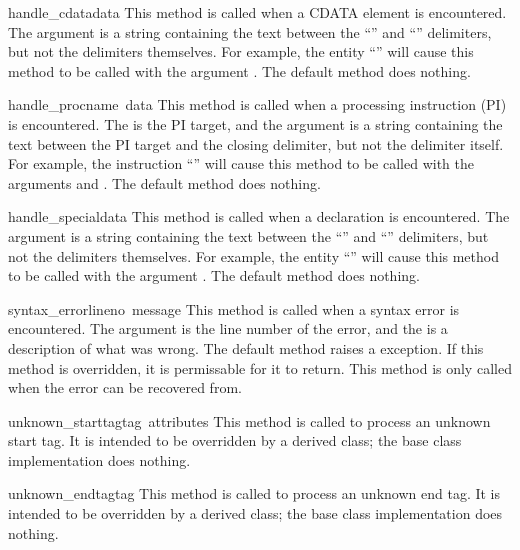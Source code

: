\begin{funcdesc}{handle_cdata}{data}
This method is called when a CDATA element is encountered.  The
 argument is a string containing the text between the
``\code{<![CDATA[}'' and ``\code{]]>}'' delimiters, but not the delimiters
themselves.  For example, the entity ``\code{<![CDATA[text]]>}'' will
cause this method to be called with the argument .  The
default method does nothing.
\end{funcdesc}

\begin{funcdesc}{handle_proc}{name\, data}
This method is called when a processing instruction (PI) is encountered.  The
 is the PI target, and the  argument is a
string containing the text between the PI target and the closing delimiter,
but not the delimiter itself.  For example, the instruction
``'' will cause this method to be called with the
arguments  and .  The default method does
nothing.
\end{funcdesc}

\begin{funcdesc}{handle_special}{data}
This method is called when a declaration is encountered.  The
 argument is a string containing the text between the
``\code{<!}'' and ``\code{>}'' delimiters, but not the delimiters
themselves.  For example, the entity ``'' will
cause this method to be called with the argument .  The
default method does nothing.
\end{funcdesc}

\begin{funcdesc}{syntax_error}{lineno\, message}
This method is called when a syntax error is encountered.  The
 argument is the line number of the error, and the
 is a description of what was wrong.  The default method 
raises a  exception.  If this method is overridden, 
it is permissable for it to return.  This method is only called when
the error can be recovered from.
\end{funcdesc}

\begin{funcdesc}{unknown_starttag}{tag\, attributes}
This method is called to process an unknown start tag.  It is intended
to be overridden by a derived class; the base class implementation
does nothing.
\end{funcdesc}

\begin{funcdesc}{unknown_endtag}{tag}
This method is called to process an unknown end tag.  It is intended
to be overridden by a derived class; the base class implementation
does nothing.
\end{funcdesc}

